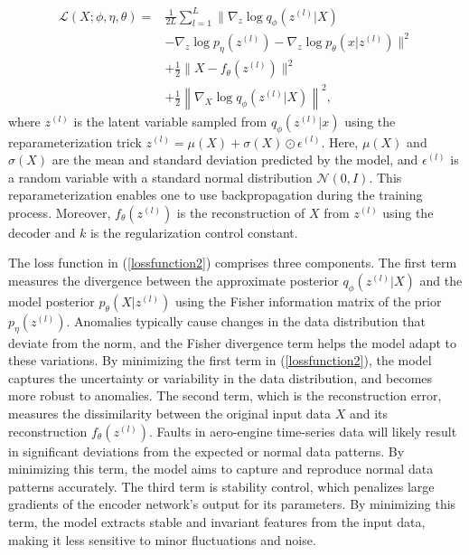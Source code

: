 \documentclass[journal]{IEEEtran}
\begin{document}
\begin{equation} \label{lossfunction2}
\begin{aligned}
\mathcal{L} (X; \phi, \eta, \theta) = &\frac{1}{2L}\sum_{l=1}^{{L}} \| \nabla_z \log q_\phi(z^{(l)}|X) \\& - \nabla_z \log p_\eta(z^{(l)}) - \nabla_z \log p_\theta(x|z^{(l)})\|^2 \\
&+ \frac{1}{2} \|X - f_\theta(z^{(l)})\|^2 \\&+ \frac{1}{2} \left\| \nabla_X \log q_\phi(z^{(l)}|X) \right\|^2,
\end{aligned}
\end{equation}
where 
$z^{(l)}$ is the latent variable sampled from $q_\phi(z^{(l)}|x)$ using the reparameterization trick 
$z^{(l)} = \mu(X) + \sigma(X) \odot \epsilon^{(l)}$. Here, $\mu(X)$ and $\sigma(X)$ are the mean and standard deviation predicted by the model, and $\epsilon^{(l)}$ is a random variable with a standard normal distribution $\mathcal{N}(0, I)$. This reparameterization enables one to use backpropagation during the training process. Moreover, $f_\theta(z^{(l)})$ is the reconstruction of $X$ from $z^{(l)}$ using the decoder and $k$ is the regularization control constant.

The loss function in (\ref{lossfunction2}) comprises three components. The first term measures the divergence between the approximate posterior $q_\phi(z^{(l)}|X)$ and the model posterior $p_\theta(X|z^{(l)})$ using the Fisher information matrix of the prior $p_\eta(z^{(l)})$. Anomalies typically cause changes in the data distribution that deviate from the norm, and the Fisher divergence term helps the model adapt to these variations. By minimizing the first term in (\ref{lossfunction2}), the model captures the uncertainty or variability in the data distribution, and becomes more robust to anomalies. The second term, which is the reconstruction error, measures the dissimilarity between the original input data $X$ and its reconstruction $f_\theta(z^{(l)})$. Faults in aero-engine time-series data will likely result in significant deviations from the expected or normal data patterns. By minimizing this term, the model aims to capture and reproduce normal data patterns accurately. The third term is stability control, which penalizes large gradients of the encoder network’s output for its parameters. By minimizing this term, the model extracts stable and invariant features from the input data, making it less sensitive to minor fluctuations and noise.
\end{document}
